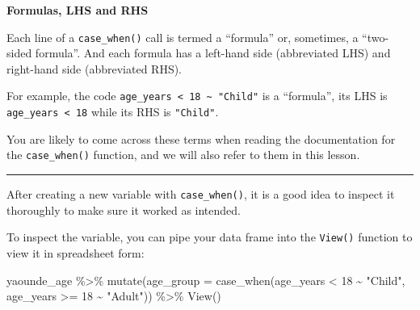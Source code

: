 \documentclass[
  letterpaper,
  DIV=11,
  numbers=noendperiod]{scrreprt}
\newenvironment{Shaded}{\begin{snugshade}}{\end{snugshade}}
\newcommand{\AttributeTok}[1]{\textcolor[rgb]{0.40,0.45,0.13}{#1}}
\newcommand{\DecValTok}[1]{\textcolor[rgb]{0.68,0.00,0.00}{#1}}
\newcommand{\FunctionTok}[1]{\textcolor[rgb]{0.28,0.35,0.67}{#1}}
\newcommand{\NormalTok}[1]{\textcolor[rgb]{0.00,0.23,0.31}{#1}}
\newcommand{\SpecialCharTok}[1]{\textcolor[rgb]{0.37,0.37,0.37}{#1}}
\newcommand{\StringTok}[1]{\textcolor[rgb]{0.13,0.47,0.30}{#1}}
\begin{document}
\begin{tcolorbox}[enhanced jigsaw, colframe=quarto-callout-note-color-frame, rightrule=.15mm, opacityback=0, breakable, coltitle=black, colbacktitle=quarto-callout-note-color!10!white, bottomrule=.15mm, leftrule=.75mm, toprule=.15mm, arc=.35mm, bottomtitle=1mm, colback=white, left=2mm, opacitybacktitle=0.6, titlerule=0mm, title=\textcolor{quarto-callout-note-color}{\faInfo}\hspace{0.5em}{Vocab}, toptitle=1mm]

\textbf{Formulas, LHS and RHS}

Each line of a \texttt{case\_when()} call is termed a ``formula'' or,
sometimes, a ``two-sided formula''. And each formula has a left-hand
side (abbreviated LHS) and right-hand side (abbreviated RHS).

For example, the code
\texttt{age\_years\ \textless{}\ 18\ \textasciitilde{}\ "Child"} is a
``formula'', its LHS is \texttt{age\_years\ \textless{}\ 18} while its
RHS is \texttt{"Child"}.

You are likely to come across these terms when reading the documentation
for the \texttt{case\_when()} function, and we will also refer to them
in this lesson.

\end{tcolorbox}

\begin{center}\rule{0.5\linewidth}{0.5pt}\end{center}

After creating a new variable with \texttt{case\_when()}, it is a good
idea to inspect it thoroughly to make sure it worked as intended.

To inspect the variable, you can pipe your data frame into the
\texttt{View()} function to view it in spreadsheet form:

\begin{Shaded}
\begin{Highlighting}[]
\NormalTok{yaounde\_age }\SpecialCharTok{\%\textgreater{}\%}  
  \FunctionTok{mutate}\NormalTok{(}\AttributeTok{age\_group =} \FunctionTok{case\_when}\NormalTok{(age\_years }\SpecialCharTok{\textless{}} \DecValTok{18} \SpecialCharTok{\textasciitilde{}} \StringTok{"Child"}\NormalTok{, }
\NormalTok{                               age\_years }\SpecialCharTok{\textgreater{}=} \DecValTok{18} \SpecialCharTok{\textasciitilde{}} \StringTok{"Adult"}\NormalTok{)) }\SpecialCharTok{\%\textgreater{}\%} 
  \FunctionTok{View}\NormalTok{()}
\end{Highlighting}
\end{Shaded}
\end{document}
